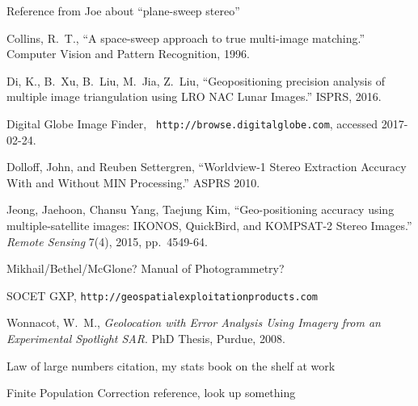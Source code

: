 \documentclass[11pt]{amsart}
\begin{document}
\begin{thebibliography}{9} %

Reference from Joe about ``plane-sweep stereo''

Collins, R.~T., ``A space-sweep approach to true
  multi-image matching.'' Computer Vision and Pattern Recognition, 1996.

Di, K., B.~Xu, B.~Liu, M.~Jia, Z.~Liu, ``Geopositioning
  precision analysis of multiple image triangulation using LRO NAC Lunar
  Images.'' ISPRS, 2016.

Digital Globe Image Finder, {\tt
  http://browse.digitalglobe.com}, accessed 2017-02-24.

Dolloff, John, and Reuben Settergren, ``Worldview-1 Stereo
  Extraction Accuracy With and Without MIN Processing.'' ASPRS 2010.

Jeong, Jaehoon, Chansu Yang, Taejung Kim, ``Geo-positioning
  accuracy using multiple-satellite images: IKONOS, QuickBird, and KOMPSAT-2
  Stereo Images.'' {\em Remote Sensing} 7(4), 2015, pp.~4549-64.

Mikhail/Bethel/McGlone? Manual of Photogrammetry?

SOCET GXP, {\tt http://geospatialexploitationproducts.com}

Wonnacot, W.~M., {\em Geolocation with Error Analysis
  Using Imagery from an Experimental Spotlight SAR}. PhD Thesis, Purdue, 2008.

Law of large numbers citation, my stats book on the shelf at work

Finite Population Correction reference, look up something


\end{thebibliography}
 
\end{document}
